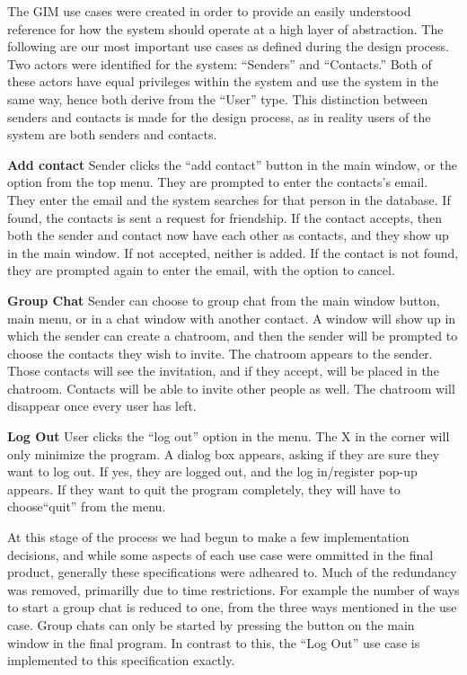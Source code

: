 The GIM use cases were created in order to provide an easily understood reference for how the system should operate at a high layer of abstraction. The following are our most important use cases as defined during the design process. Two actors were identified for the system: ``Senders'' and ``Contacts.'' Both of these actors have equal privileges within the system and use the system in the same way, hence both derive from the ``User'' type. This distinction between senders and contacts is made for the design process, as in reality users of the system are both senders and contacts.

{\bf Add contact}
Sender clicks the ``add contact'' button in the main window, or the option from the top menu. They are prompted to enter the contacts's email. They enter the email and the system searches for that person in the database. If found, the contacts is sent a request for friendship. If the contact accepts, then both the sender and contact now have each other as contacts, and they show up in the main window. If not accepted, neither is added. If the contact is not found, they are prompted again to enter the email, with the option to cancel.

{\bf Group Chat}
Sender can choose to group chat from the main window button, main menu, or in a chat window with another contact. A window will show up in which the sender can create a chatroom, and then the sender will be prompted to choose the contacts they wish to invite. The chatroom appears to the sender. Those contacts will see the invitation, and if they accept, will be placed in the chatroom. Contacts will be able to invite other people as well. The chatroom will disappear once every user has left.

{\bf Log Out}
User clicks the ``log out'' option in the menu. The X in the corner will only minimize the program. A dialog box appears, asking if they are sure they want to log out. If yes, they are logged out, and the log in/register pop-up appears. If they want to quit the program completely, they will have to choose``quit'' from the menu.

At this stage of the process we had begun to make a few implementation decisions, and while some aspects of each use case were ommitted in the final product, generally these specifications were adheared to. Much of the redundancy was removed, primarilly due to time restrictions. For example the number of ways to start a group chat is reduced to one, from the three ways mentioned in the use case. Group chats can only be started by pressing the button on the main window in the final program. In contrast to this, the ``Log Out'' use case is implemented to this specification exactly.

